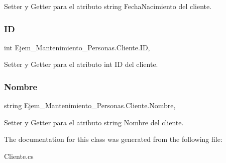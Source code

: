 Setter y Getter para el atributo string Fecha\+Nacimiento del cliente. 

\mbox{\label{class_ejem___mantenimiento___personas_1_1_cliente_ae229bd0285e992ec0170c930ea508dc6}} 
\subsubsection{\texorpdfstring{ID}{ID}}
{\footnotesize\ttfamily int Ejem\+\_\+\+Mantenimiento\+\_\+\+Personas.\+Cliente.\+ID\hspace{0.3cm}{\ttfamily [get]}, {\ttfamily [set]}}



Setter y Getter para el atributo int ID del cliente. 

\mbox{\label{class_ejem___mantenimiento___personas_1_1_cliente_abfd662cc9b3f46750983780c39dc6aef}} 
\subsubsection{\texorpdfstring{Nombre}{Nombre}}
{\footnotesize\ttfamily string Ejem\+\_\+\+Mantenimiento\+\_\+\+Personas.\+Cliente.\+Nombre\hspace{0.3cm}{\ttfamily [get]}, {\ttfamily [set]}}



Setter y Getter para el atributo string Nombre del cliente. 



The documentation for this class was generated from the following file\+:\begin{DoxyCompactItemize}
\item 
Cliente.\+cs\end{DoxyCompactItemize}
